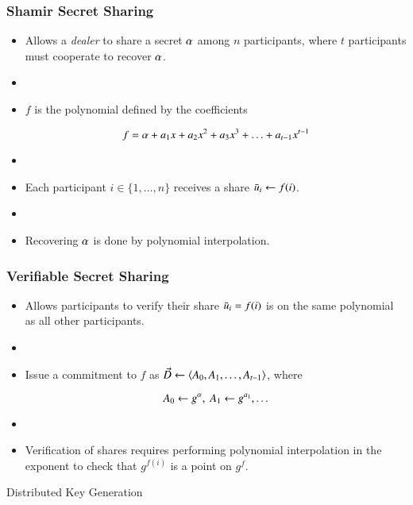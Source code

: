 \documentclass[hyperref={pdfpagelabels=true},table,dvipsnames,14pt,aspectratio=169]{beamer}
\begin{document}
\begin{frame}
  \frametitle{Shamir Secret Sharing}

  \begin{itemize}
    \item<1-> Allows a \emph{dealer} to share a secret $\alpha$ among $n$ participants, where $t$ participants must cooperate to recover $\alpha$.
    \item[]
    \item<2-> $f$ is the polynomial defined by the coefficients

      \[f = \alpha + a_1 x + a_2 x^2 + a_3 x^3 + \ldots + a_{t-1}x^{t-1}  \]

    \item[]
    \item<3-> Each participant $i \in \{1, \ldots, n \}$ receives a share $\bar{u}_i \gets f(i) $.
    \item[]
    \item<4-> Recovering $\alpha$ is done by polynomial interpolation.
  \end{itemize}
\end{frame}

\begin{frame}
  \frametitle{Verifiable Secret Sharing}

  \begin{itemize}
    \item<1-> Allows participants to verify their share $\bar{u}_i = f(i)$ is on the same polynomial as all other participants.
    \item[]
    \item<2-> Issue a commitment to $f$ as $\vec{D} \gets \langle A_0, A_1, \ldots, A_{t-1}  \rangle$, where

      \[ A_0 \gets g^{\alpha},\ A_1 \gets g^{a_1}, \ldots \]
    \item[]
    \item<3-> Verification of shares requires performing polynomial interpolation in the exponent to check that $g^{f(i)}$ is a point on $g^f$.
  \end{itemize}
\end{frame}

\begin{frame}
  \huge
  \centering
  Distributed Key Generation
\end{frame}
\end{document}
